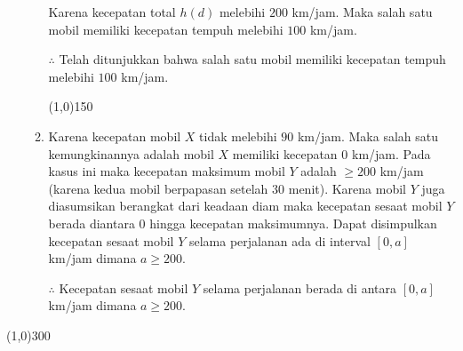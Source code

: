 \begin{enumerate}[leftmargin=*, label={\arabic*}.]
\begin{enumerate}[label={\alph*}.]
\begin{center}
    \end{center}
    Karena kecepatan total $h(d)$ melebihi $200$ km/jam. Maka salah satu mobil memiliki kecepatan tempuh 
    melebihi $100$ km/jam.

    $\therefore$ Telah ditunjukkan bahwa salah satu mobil memiliki kecepatan tempuh melebihi $100$ 
    km/jam.
\begin{center}
    \line(1,0){150}
\end{center}
    \item Karena kecepatan mobil $X$ tidak melebihi $90$ km/jam. Maka salah satu kemungkinannya 
    adalah mobil $X$ memiliki kecepatan $0$ km/jam. Pada kasus ini maka kecepatan maksimum mobil $Y$ 
    adalah $\geq 200$ km/jam (karena kedua mobil berpapasan setelah 30 menit). Karena mobil $Y$ juga 
    diasumsikan berangkat dari keadaan diam maka kecepatan sesaat mobil $Y$ berada diantara $0$ hingga 
    kecepatan maksimumnya. Dapat disimpulkan kecepatan sesaat mobil $Y$ selama perjalanan ada di interval 
    $[0, a]$ km/jam dimana $a \geq 200$.

    $\therefore$ Kecepatan sesaat mobil $Y$ selama perjalanan berada di antara $[0,a]$ km/jam dimana 
    $a \geq 200$.
\end{enumerate}

\end{enumerate}
\begin{center}
    \line(1,0){300}
\end{center}